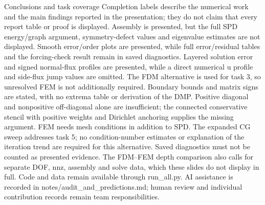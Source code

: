 \documentclass{beamer}
\begin{document}
\begin{frame}{Conclusions and task coverage}
{Completion labels describe the numerical work and the main findings reported in
the presentation; they do not claim that every report table or proof is displayed.
Assembly is presented, but the full SPD energy/graph argument, symmetry-defect
values and eigenvalue estimates are not displayed. Smooth error/order plots are
presented, while full error/residual tables and the forcing-check result remain
in saved diagnostics. Layered solution error and signed normal-flux profiles are
presented, while a direct numerical u profile and side-flux jump values are omitted.
The FDM alternative is used for task 3, so unresolved FEM is not additionally required.
Boundary bounds and matrix signs are stated, with no extrema table or derivation
of the DMP. Positive diagonal and nonpositive off-diagonal alone are insufficient;
the connected conservative stencil with positive weights and Dirichlet anchoring
supplies the missing argument. FEM needs mesh conditions in addition to SPD.
The expanded CG sweep addresses task 5; no condition-number
estimates or explanation of the iteration trend are required for this alternative.
Saved diagnostics must not be counted as presented evidence. The FDM--FEM depth
comparison also calls for separate DOF, nnz, assembly and solve data, which these
slides do not display in full. Code and data remain available through run_all.py.
AI assistance is recorded in notes/audit_and_predictions.md; human review and
individual contribution records remain team responsibilities.}
\end{frame}
\end{document}
